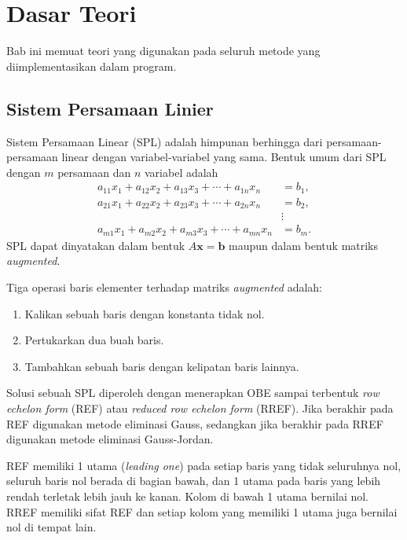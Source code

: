\documentclass[12pt,a4paper]{report}
\begin{document}
\chapter{Dasar Teori}

Bab ini memuat teori yang digunakan pada seluruh metode yang diimplementasikan dalam program.

\section{Sistem Persamaan Linier}

Sistem Persamaan Linear (SPL) adalah himpunan berhingga dari persamaan-persamaan linear dengan variabel-variabel yang sama. Bentuk umum dari SPL dengan $m$ persamaan dan $n$ variabel adalah
\begin{equation*}
\begin{aligned}
a_{11}x_1+a_{12}x_2+a_{13}x_3+\cdots+a_{1n}x_n &= b_1,\\
a_{21}x_1+a_{22}x_2+a_{23}x_3+\cdots+a_{2n}x_n &= b_2,\\
&\vdots\\
a_{m1}x_1+a_{m2}x_2+a_{m3}x_3+\cdots+a_{mn}x_n &= b_m.
\end{aligned}
\end{equation*}
SPL dapat dinyatakan dalam bentuk $A\mathbf{x}=\mathbf{b}$ maupun dalam bentuk matriks \textit{augmented}. \cite{tubes,pakrin-spl1}

Tiga operasi baris elementer terhadap matriks \textit{augmented} adalah:
\begin{enumerate}
    \item Kalikan sebuah baris dengan konstanta tidak nol.
    \item Pertukarkan dua buah baris.
    \item Tambahkan sebuah baris dengan kelipatan baris lainnya.
\end{enumerate}
Solusi sebuah SPL diperoleh dengan menerapkan OBE sampai terbentuk \textit{row echelon form} (REF) atau \textit{reduced row echelon form} (RREF). Jika berakhir pada REF digunakan metode eliminasi Gauss, sedangkan jika berakhir pada RREF digunakan metode eliminasi Gauss-Jordan. \cite{pakrin-spl1}

REF memiliki 1 utama (\textit{leading one}) pada setiap baris yang tidak seluruhnya nol, seluruh baris nol berada di bagian bawah, dan 1 utama pada baris yang lebih rendah terletak lebih jauh ke kanan. Kolom di bawah 1 utama bernilai nol. RREF memiliki sifat REF dan setiap kolom yang memiliki 1 utama juga bernilai nol di tempat lain. \cite{pakrin-eselon}
\end{document}
